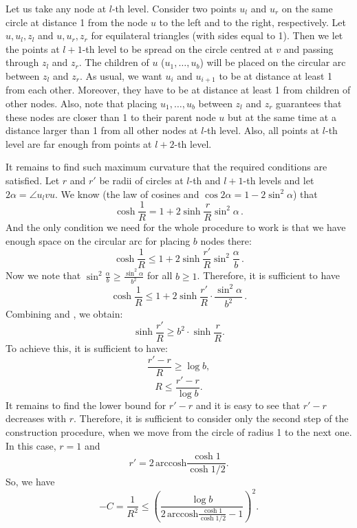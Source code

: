 \documentclass{article} %
\begin{document}
Let us take any node at $l$-th level. Consider two points $u_l$ and $u_r$ on the same circle at distance 1 from the node $u$ to the left and to the right, respectively.
Let $u,u_l,z_l$ and $u,u_r,z_r$ for equilateral triangles (with sides equal to 1). Then we let the points at $l+1$-th level to be spread on the circle centred at $v$ and passing through $z_l$ and $z_r$. The children of $u$ ($u_1, \ldots, u_{b}$) will be placed on the circular arc between $z_l$ and $z_r$. As usual, we want $u_i$ and $u_{i+1}$ to be at distance at least 1 from each other. Moreover, they have to be at distance at least 1 from children of other nodes. Also, note that placing $u_1, \ldots, u_{b}$ between $z_l$ and $z_r$ guarantees that these nodes are closer than 1 to their parent node $u$ but at the same time at a distance larger than 1 from all other nodes at $l$-th level. Also, all points at $l$-th level are far enough from points at $l+2$-th level.

It remains to find such maximum curvature that the required conditions are satisfied. Let $r$ and $r'$ be radii of circles at $l$-th and $l+1$-th levels and let $2\alpha = \angle u_l v u$. We know (the law of cosines and $\cos 2\alpha = 1 - 2\sin^2 \alpha$) that
\begin{equation}\label{eq:1}
\cosh \frac{1}{R} = 1 + 2 \sinh \frac{r}{R} \sin^2 \alpha \,.
\end{equation}
And the only condition we need for the whole procedure to work is that we have enough space on the circular arc for placing $b$ nodes there:
\[
\cosh \frac{1}{R} \le 1 + 2 \sinh \frac{r'}{R} \sin^2 \frac{\alpha}{b} \,.
\]
Now we note that $\sin^2 \frac{\alpha}{b} \ge \frac{\sin^2 \alpha}{b^2}$ for all $b \ge 1$. Therefore, it is sufficient to have
\begin{equation}\label{eq:2}
\cosh \frac{1}{R} \le 1 + 2 \sinh \frac{r'}{R} \cdot \frac{\sin^2 \alpha}{b^2} \,.
\end{equation}
Combining  and , we obtain:
\[
\sinh \frac{r'}{R} \ge b^2 \cdot \sinh \frac{r}{R}.
\]
To achieve this, it is sufficient to have:
\[
\frac{r' - r}{R} \ge \log b,
\]
\[
R \le \frac{r' - r}{\log b}.
\]
It remains to find the lower bound for $r' - r$ and it is easy to see that $r' - r$ decreases with $r$. Therefore, it is sufficient to consider only the second step of the construction procedure, when we move from the circle of radius 1 to the next one. In this case, $r = 1$ and 
\[
r' = 2 \, \mathrm{arccosh} \frac{\cosh 1}{\cosh 1/2}.
\]
So, we have 
\[
-C = \frac{1}{R^2} \le \left( \frac{\log b}{2 \, \mathrm{arccosh} \frac{\cosh 1}{\cosh 1/2} - 1} \right)^2.
\]
\end{document}
